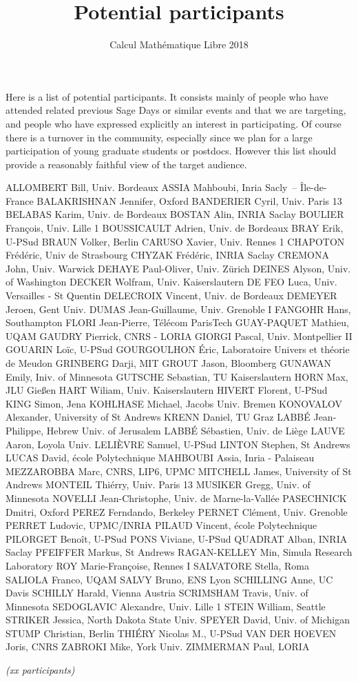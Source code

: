 \documentclass{paper}
\title{Potential participants}
\subtitle{Calcul Mathématique Libre 2018}
\date{}
\begin{document}
\maketitle
\thispagestyle{empty}

Here is a list of potential participants. It consists mainly of people
who have attended related previous Sage Days or similar events and
that we are targeting, and people who have expressed explicitly an
interest in participating. Of course there is a turnover in the
community, especially since we plan for a large participation of young
graduate students or postdocs. However this list should provide a
reasonably faithful view of the target audience.

\bigskip

\obeylines
ALLOMBERT Bill, Univ. Bordeaux
ASSIA Mahboubi, Inria Sacly -- Île-de-France
BALAKRISHNAN Jennifer, Oxford
BANDERIER Cyril, Univ. Paris 13
BELABAS Karim, Univ. de Bordeaux
BOSTAN Alin, INRIA Saclay
BOULIER François, Univ. Lille 1
BOUSSICAULT Adrien, Univ. de Bordeaux
BRAY Erik, U-PSud
BRAUN Volker, Berlin
CARUSO Xavier, Univ. Rennes 1
CHAPOTON Frédéric, Univ de Strasbourg
CHYZAK Frédéric, INRIA Saclay
CREMONA John, Univ. Warwick
DEHAYE Paul-Oliver, Univ. Zürich
DEINES Alyson, Univ. of Washington
DECKER Wolfram, Univ. Kaiserslautern
DE FEO Luca, Univ. Versailles - St Quentin
DELECROIX Vincent, Univ. de Bordeaux
DEMEYER Jeroen, Gent Univ.
DUMAS Jean-Guillaume, Univ. Grenoble I
FANGOHR Hans, Southampton
FLORI Jean-Pierre, Télécom ParisTech
GUAY-PAQUET Mathieu, UQAM
GAUDRY Pierrick, CNRS - LORIA
GIORGI Pascal, Univ. Montpellier II
GOUARIN Loïc, U-PSud
GOURGOULHON Éric, Laboratoire Univers et théorie de Meudon
GRINBERG Darji, MIT
GROUT Jason, Bloomberg
GUNAWAN Emily, Iniv. of Minnesota
GUTSCHE Sebastian, TU Kaiserslautern
HORN Max, JLU Gießen
HART Wiliam, Univ. Kaiserslautern
HIVERT Florent, U-PSud
KING Simon, Jena
KOHLHASE Michael, Jacobs Univ. Bremen
KONOVALOV Alexander, University of St Andrews
KRENN Daniel, TU Graz
LABBÉ Jean-Philippe, Hebrew Univ. of Jerusalem
LABBÉ Sébastien, Univ. de Liège
LAUVE Aaron, Loyola Univ.
LELIÈVRE Samuel, U-PSud
LINTON Stephen, St Andrews
LUCAS David, école Polytechnique
MAHBOUBI Assia, Inria - Palaiseau
MEZZAROBBA Marc, CNRS, LIP6, UPMC
MITCHELL James, University of St Andrews
MONTEIL Thiérry, Univ. Paris 13
MUSIKER Gregg, Univ. of Minnesota
NOVELLI Jean-Christophe, Univ. de Marne-la-Vallée
PASECHNICK Dmitri, Oxford
PEREZ Ferndando, Berkeley
PERNET Clément, Univ. Grenoble
PERRET Ludovic, UPMC/INRIA
PILAUD Vincent, école Polytechnique
PILORGET Benoît, U-PSud
PONS Viviane, U-PSud
QUADRAT Alban, INRIA Saclay
PFEIFFER Markus, St Andrews
RAGAN-KELLEY Min, Simula Research Laboratory
ROY Marie-Françoise, Rennes I
SALVATORE Stella, Roma
SALIOLA Franco, UQAM
SALVY Bruno, ENS Lyon
SCHILLING Anne, UC Davis
SCHILLY Harald, Vienna Austria
SCRIMSHAM Travis, Univ. of Minnesota
SEDOGLAVIC Alexandre, Univ. Lille 1
STEIN William, Seattle
STRIKER Jessica, North Dakota State Univ.
SPEYER David, Univ. of Michigan
STUMP Christian, Berlin
THIÉRY Nicolas M., U-PSud
VAN DER HOEVEN Joris, CNRS
ZABROKI Mike, York Univ.
ZIMMERMAN Paul, LORIA


\medskip
\emph{(xx participants)}
\end{document}
